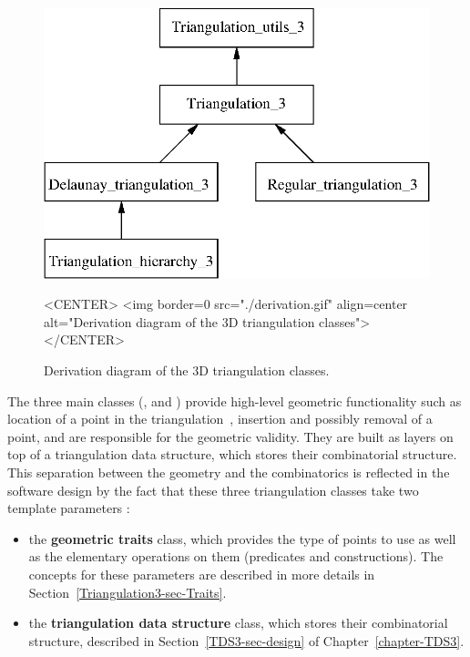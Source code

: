 \begin{figure}[htbp]
\begin{ccTexOnly}
\begin{center} 
\includegraphics{derivation.eps} 
\end{center}
\end{ccTexOnly}
\caption{Derivation diagram of the 3D triangulation classes.
\label{t3_derivation}}
\begin{ccHtmlOnly}
<CENTER>
<img border=0 src="./derivation.gif" align=center
 alt="Derivation diagram of the 3D triangulation classes"> 
</CENTER>
\end{ccHtmlOnly}
\end{figure} 

The three main classes (, 
and ) provide high-level geometric functionality
such as location of a point in the triangulation~\cite{dpt-wt-02}, insertion
and possibly removal of a point, and are responsible for the geometric
validity.  They are built as layers on top of a triangulation data structure,
which stores their combinatorial structure.  This separation between the
geometry and the combinatorics is reflected in the software design by the fact
that these three triangulation classes take two template parameters :

\begin{itemize}
\item {} the \textbf{geometric traits} class, which provides the type of points
to use as well as the elementary operations on them (predicates and
constructions).  The concepts for these parameters are described in more
details in Section~\ref{Triangulation3-sec-Traits}.
\item {} the \textbf{triangulation data structure} class, which stores their
combinatorial structure, described in Section~\ref{TDS3-sec-design} of
Chapter~\ref{chapter-TDS3}.
\end{itemize}

